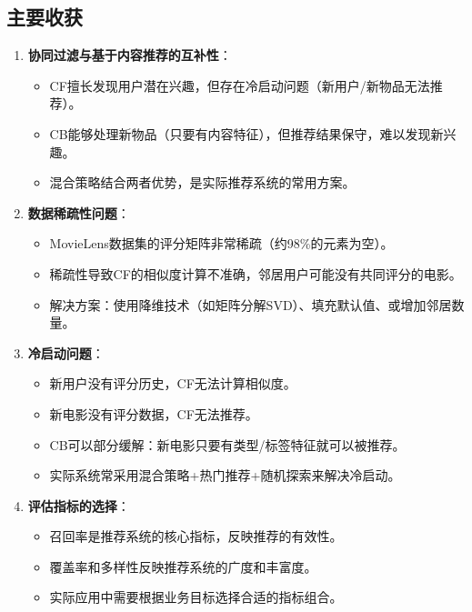 \documentclass[a4paper]{article}
\begin{document}
\subsection{主要收获}

\begin{enumerate}
    \item \textbf{协同过滤与基于内容推荐的互补性}：
    \begin{itemize}
        \item CF擅长发现用户潜在兴趣，但存在冷启动问题（新用户/新物品无法推荐）。
        \item CB能够处理新物品（只要有内容特征），但推荐结果保守，难以发现新兴趣。
        \item 混合策略结合两者优势，是实际推荐系统的常用方案。
    \end{itemize}
    
    \item \textbf{数据稀疏性问题}：
    \begin{itemize}
        \item MovieLens数据集的评分矩阵非常稀疏（约98\%的元素为空）。
        \item 稀疏性导致CF的相似度计算不准确，邻居用户可能没有共同评分的电影。
        \item 解决方案：使用降维技术（如矩阵分解SVD）、填充默认值、或增加邻居数量。
    \end{itemize}
    
    \item \textbf{冷启动问题}：
    \begin{itemize}
        \item 新用户没有评分历史，CF无法计算相似度。
        \item 新电影没有评分数据，CF无法推荐。
        \item CB可以部分缓解：新电影只要有类型/标签特征就可以被推荐。
        \item 实际系统常采用混合策略+热门推荐+随机探索来解决冷启动。
    \end{itemize}
    
    \item \textbf{评估指标的选择}：
    \begin{itemize}
        \item 召回率是推荐系统的核心指标，反映推荐的有效性。
        \item 覆盖率和多样性反映推荐系统的广度和丰富度。
        \item 实际应用中需要根据业务目标选择合适的指标组合。
    \end{itemize}
\end{enumerate}
\end{document}
